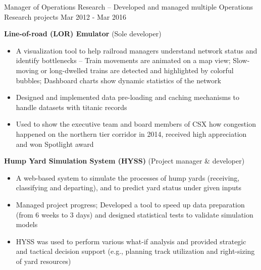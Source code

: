 \begin{cventries}
\cventry
{Manager of Operations Research \tiny{-- Developed and managed multiple Operations Research projects}}         %
{}                                       %
{}                                       %
{Mar 2012 - Mar 2016}                    %
{                                        %
    \begin{cvitems}  
        \item {
\textbf{Line-of-road (LOR) Emulator} {(Sole developer)} 
\begin{itemize}
    \item  A visualization tool to help railroad managers understand network status and identify bottlenecks -- Train movements are animated on a map view; Slow-moving or long-dwelled trains are detected and highlighted by colorful bubbles; Dashboard charts show dynamic statistics of the network
    \item  Designed and implemented data pre-loading and caching mechanisms to handle datasets with titanic records
    \item  Used to show the executive team and board members of CSX how congestion happened on the northern tier corridor in 2014, received high appreciation and won Spotlight award
\end{itemize} 
		}
        \item {
\textbf{Hump Yard Simulation System (HYSS)} {(Project manager \& developer)}
\begin{itemize}
    \item  A web-based system to simulate the processes of hump yards (receiving, classifying and departing), and to predict yard status under given inputs
    \item  Managed project progress; Developed a tool to speed up data preparation (from 6 weeks to 3 days) and designed statistical tests to validate simulation models
    \item  HYSS was used to perform various what-if analysis and provided strategic and tactical decision support (e.g., planning track utilization and right-sizing of yard resources)
\end{itemize}     
        }
    \end{cvitems}
}



\end{cventries}
